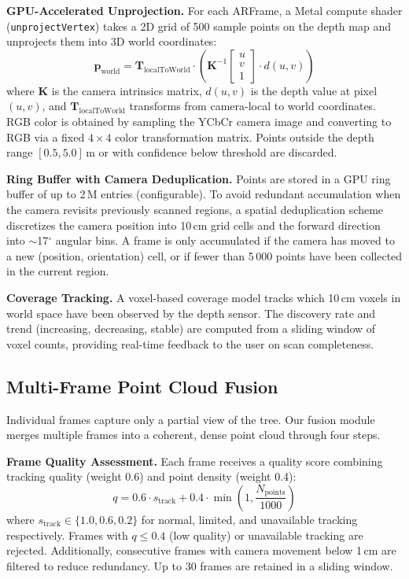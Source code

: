 \documentclass[article,final]{iclr2024_conference}
\begin{document}
\textbf{GPU-Accelerated Unprojection.}
For each ARFrame, a Metal compute shader (\texttt{unprojectVertex}) takes a 2D grid of 500 sample points on the depth map and unprojects them into 3D world coordinates:
\begin{equation}
\mathbf{p}_{\text{world}} = \mathbf{T}_{\text{localToWorld}} \cdot \left( \mathbf{K}^{-1} \begin{bmatrix} u \\ v \\ 1 \end{bmatrix} \cdot d(u,v) \right)
\end{equation}
where $\mathbf{K}$ is the camera intrinsics matrix, $d(u,v)$ is the depth value at pixel $(u,v)$, and $\mathbf{T}_{\text{localToWorld}}$ transforms from camera-local to world coordinates. RGB color is obtained by sampling the YCbCr camera image and converting to RGB via a fixed $4\times4$ color transformation matrix. Points outside the depth range $[0.5, 5.0]$\,m or with confidence below threshold are discarded.

\textbf{Ring Buffer with Camera Deduplication.}
Points are stored in a GPU ring buffer of up to 2\,M entries (configurable). To avoid redundant accumulation when the camera revisits previously scanned regions, a spatial deduplication scheme discretizes the camera position into 10\,cm grid cells and the forward direction into $\sim$17$^\circ$ angular bins. A frame is only accumulated if the camera has moved to a new (position, orientation) cell, or if fewer than 5\,000 points have been collected in the current region.

\textbf{Coverage Tracking.}
A voxel-based coverage model tracks which 10\,cm voxels in world space have been observed by the depth sensor. The discovery rate and trend (increasing, decreasing, stable) are computed from a sliding window of voxel counts, providing real-time feedback to the user on scan completeness.

\subsection{Multi-Frame Point Cloud Fusion}
\label{sec:fusion}

Individual frames capture only a partial view of the tree. Our fusion module merges multiple frames into a coherent, dense point cloud through four steps.

\textbf{Frame Quality Assessment.}
Each frame receives a quality score combining tracking quality (weight 0.6) and point density (weight 0.4):
\begin{equation}
q = 0.6 \cdot s_{\text{track}} + 0.4 \cdot \min\!\left(1, \frac{N_{\text{points}}}{1000}\right)
\end{equation}
where $s_{\text{track}} \in \{1.0, 0.6, 0.2\}$ for normal, limited, and unavailable tracking respectively. Frames with $q \leq 0.4$ (low quality) or unavailable tracking are rejected. Additionally, consecutive frames with camera movement below 1\,cm are filtered to reduce redundancy. Up to 30 frames are retained in a sliding window.
\end{document}
